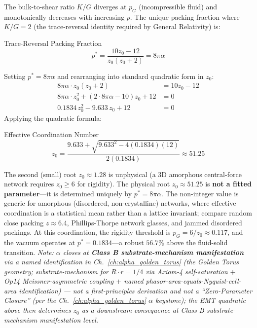 The bulk-to-shear ratio $K/G$ diverges at $p_G$ (incompressible fluid) and monotonically decreases with increasing $p$. The unique packing fraction where $K/G = 2$ (the trace-reversal identity required by General Relativity) is:
\begin{resultbox}{Trace-Reversal Packing Fraction}
\begin{equation}
    p^* = \frac{10 z_0 - 12}{z_0(z_0 + 2)} = 8\pi\alpha
\end{equation}
\end{resultbox}
Setting $p^* = 8\pi\alpha$ and rearranging into standard quadratic form in $z_0$:
\begin{align}
    8\pi\alpha \cdot z_0(z_0 + 2) &= 10 z_0 - 12 \nonumber\\
    8\pi\alpha \cdot z_0^2 + (2 \cdot 8\pi\alpha - 10) z_0 + 12 &= 0 \nonumber\\
    0.1834\, z_0^2 - 9.633\, z_0 + 12 &= 0
    \label{eq:z0_quadratic}
\end{align}
Applying the quadratic formula:
\begin{resultbox}{Effective Coordination Number}
\begin{equation}
    z_0 = \frac{9.633 + \sqrt{9.633^2 - 4(0.1834)(12)}}{2(0.1834)}
    \approx \boxed{51.25}
    \label{eq:z0_solution}
\end{equation}
\end{resultbox}
The second (small) root $z_0 \approx 1.28$ is unphysical (a 3D amorphous central-force network requires $z_0 \geq 6$ for rigidity). The physical root $z_0 \approx 51.25$ is \textbf{not a fitted parameter}---it is determined uniquely by $p^* = 8\pi\alpha$. The non-integer value is generic for amorphous (disordered, non-crystalline) networks, where effective coordination is a statistical mean rather than a lattice invariant; compare random close packing $z \approx 6.4$, Phillips-Thorpe network glasses, and jammed disordered packings. At this coordination, the rigidity threshold is $p_G = 6/z_0 \approx 0.117$, and the vacuum operates at $p^* = 0.1834$---a robust $56.7\%$ above the fluid-solid transition. \textit{Note: $\alpha$ closes at \textbf{Class B substrate-mechanism manifestation} via a named identification in Ch.~\ref{ch:alpha_golden_torus} (the Golden Torus geometry; substrate-mechanism for $R \cdot r = 1/4$ via Axiom-4 self-saturation $+$ Op14 Meissner-asymmetric coupling $+$ named phasor-area-equals-Nyquist-cell-area identification) --- not a first-principles derivation and not a ``Zero-Parameter Closure'' (per the Ch.~\ref{ch:alpha_golden_torus} $\alpha$ keystone); the EMT quadratic above then determines $z_0$ as a downstream consequence at Class B substrate-mechanism manifestation level.}

